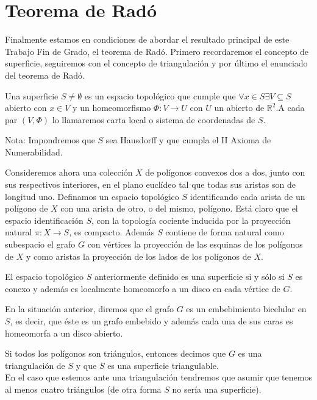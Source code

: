 \chapter{Teorema de Radó}

Finalmente estamos en condiciones de abordar el resultado principal de este Trabajo Fin de Grado, el teorema de Radó. Primero recordaremos  el concepto de superficie, seguiremos con el concepto de triangulación y por último el enunciado del teorema de Radó.

\begin{definition}
Una superficie $S \neq \emptyset$ es un espacio topológico que cumple que $\forall x \in S \exists V \subseteq S$ abierto con $x \in V$ y un homeomorfismo $\Phi : V \rightarrow U$ con $U$ un abierto de $\mathbb{R}^2$.A cada par $(V,\Phi)$ lo llamaremos carta local o sistema de coordenadas de $S$.
\end{definition}

Nota: Impondremos que $S$ sea Hausdorff y que cumpla el II Axioma de Numerabilidad.

Consideremos ahora una colección $X$ de polígonos convexos dos a dos, junto con sus respectivos interiores, en el plano euclídeo tal que todas sus aristas son de longitud uno. Definamos un espacio topológico $S$ identificando cada arista de un polígono de $X$  con una  arista de otro, o del mismo, polígono. Está claro que el espacio identificación $S$, con la topología cociente inducida por la proyección natural $\pi\colon X\to S$,  es compacto. Además $S$ contiene de forma natural como subespacio el grafo $G$ con  vértices   la proyección de las esquinas de los polígonos de $X$ y como aristas la proyección de los lados de los polígonos de $X$.

\begin{lemma}
El espacio topológico $S$ anteriormente definido es una superficie si y sólo si $S$ es conexo y además es localmente homeomorfo a un disco en cada vértice de $G$.
\end{lemma}

\begin{definition}
En la situación anterior, diremos que el grafo $G$ es un embebimiento bicelular en $S$, es decir, que éste es un grafo embebido y además cada una de sus caras es homeomorfa a un disco abierto.
\end{definition}

\begin{definition}
Si todos los polígonos son triángulos, entonces decimos que $G$ es una triangulación de $S$ y que $S$ es una superficie triangulable.
\\
En el caso que estemos ante una triangulación tendremos que asumir que tenemos al menos cuatro triángulos (de otra forma $S$ no sería una superficie).
\end{definition}

